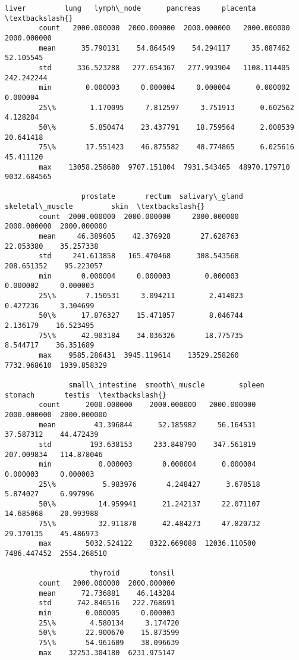 \documentclass[11pt]{article}
\begin{document}
\begin{Verbatim}[commandchars=\\\{\}]
                      liver         lung   lymph\_node      pancreas     placenta  \textbackslash{}
        count   2000.000000  2000.000000  2000.000000   2000.000000  2000.000000   
        mean      35.790131    54.864549    54.294117     35.087462    52.105545   
        std      336.523288   277.654367   277.993904   1108.114405   242.242244   
        min        0.000003     0.000004     0.000004      0.000002     0.000004   
        25\%        1.170095     7.812597     3.751913      0.602562     4.128284   
        50\%        5.850474    23.437791    18.759564      2.008539    20.641418   
        75\%       17.551423    46.875582    48.774865      6.025616    45.411120   
        max    13058.258680  9707.151804  7931.543465  48970.179710  9032.684565   
        
                  prostate       rectum  salivary\_gland  skeletal\_muscle         skin  \textbackslash{}
        count  2000.000000  2000.000000     2000.000000      2000.000000  2000.000000   
        mean     46.389605    42.376928       27.628763        22.053380    35.257338   
        std     241.613858   165.470468      308.543568       208.651352    95.223057   
        min       0.000004     0.000003        0.000003         0.000002     0.000003   
        25\%       7.150531     3.094211        2.414023         0.427236     3.304699   
        50\%      17.876327    15.471057        8.046744         2.136179    16.523495   
        75\%      42.903184    34.036326       18.775735         8.544717    36.351689   
        max    9585.286431  3945.119614    13529.258260      7732.968610  1939.858329   
        
               small\_intestine  smooth\_muscle        spleen      stomach       testis  \textbackslash{}
        count      2000.000000    2000.000000   2000.000000  2000.000000  2000.000000   
        mean         43.396844      52.185982     56.164531    37.587312    44.472439   
        std         193.638153     233.848790    347.561819   207.009834   114.878046   
        min           0.000003       0.000004      0.000004     0.000003     0.000003   
        25\%           5.983976       4.248427      3.678518     5.874027     6.997996   
        50\%          14.959941      21.242137     22.071107    14.685068    20.993988   
        75\%          32.911870      42.484273     47.820732    29.370135    45.486973   
        max        5032.524122    8322.669088  12036.110500  7486.447452  2554.268510   
        
                    thyroid       tonsil  
        count   2000.000000  2000.000000  
        mean      72.736881    46.143284  
        std      742.846516   222.768691  
        min        0.000005     0.000003  
        25\%        4.580134     3.174720  
        50\%       22.900670    15.873599  
        75\%       54.961609    38.096639  
        max    32253.304180  6231.975147  
\end{Verbatim}
            
\end{document}
